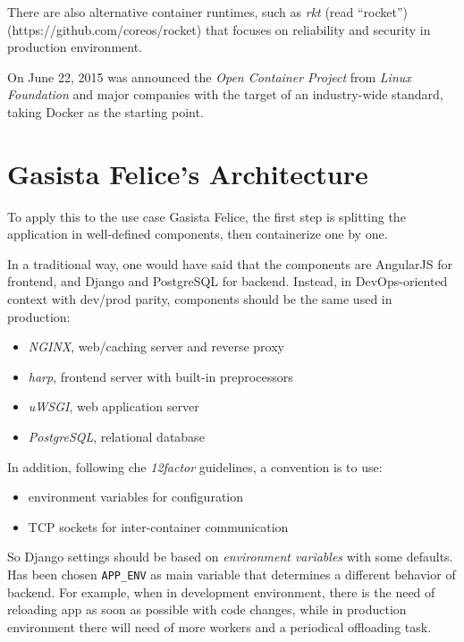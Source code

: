 There are also alternative container runtimes, such as \textit{rkt} (read
``rocket'') (https://github.com/coreos/rocket) that focuses on
reliability and security in production environment.

On June 22, 2015 was announced the \textit{Open Container
Project}\cite{OpenContainerProject} from \textit{Linux Foundation} and
major companies with the target of an industry-wide standard, taking
Docker as the starting point.

\section{Gasista Felice's
Architecture}\label{gasista-felices-architecture}

To apply this to the use case Gasista Felice, the first step is
splitting the application in well-defined components, then containerize
one by one.

In a traditional way, one would have said that the components are
AngularJS for frontend, and Django and PostgreSQL for backend. Instead,
in DevOps-oriented context with dev/prod parity, components should be
the same used in production:
\begin{itemize}

\item
  \textit{NGINX}, web/caching server and reverse proxy
\item
  \textit{harp}, frontend server with built-in preprocessors
\item
  \textit{uWSGI}, web application server
\item
  \textit{PostgreSQL}, relational database
\end{itemize}

In addition, following che \textit{12factor} guidelines, a convention is to use:
\begin{itemize}

\item
  environment variables for configuration
\item
  TCP sockets for inter-container communication
\end{itemize}

So Django settings should be based on \textit{environment variables} with
some defaults. Has been chosen \texttt{APP\_ENV} as main variable that
determines a different behavior of backend. For example, when in
development environment, there is the need of reloading app as soon as
possible with code changes, while in production environment there will
need of more workers and a periodical offloading task.


